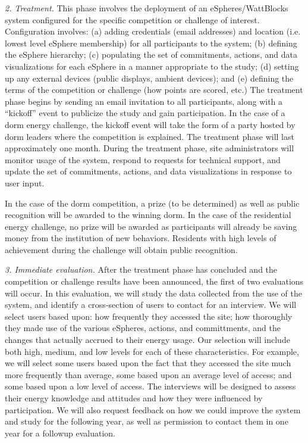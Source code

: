 {\em 2. Treatment.}  This phase involves the deployment of an
eSpheres/WattBlocks system configured for the specific competition or
challenge of interest.  Configuration involves: (a) adding credentials
(email addresses) and location (i.e. lowest level eSphere membership) for
all participants to the system; (b) defining the eSphere hierarchy; (c)
populating the set of commitments, actions, and data visualizations for
each eSphere in a manner appropriate to the study; (d) setting up any
external devices (public displays, ambient devices); and (e) defining the
terms of the competition or challenge (how points are scored, etc.)  The
treatment phase begins by sending an email invitation to all participants,
along with a ``kickoff'' event to publicize the study and gain
participation. In the case of a dorm energy challenge, the kickoff event
will take the form of a party hosted by dorm leaders where the competition
is explained.  The treatment phase will last approximately one month.
During the treatment phase, site administrators will monitor usage of the
system, respond to requests for technical support, and update the set of
commitments, actions, and data visualizations in response to user input.

In the case of the dorm competition, a prize (to be determined) as well as
public recognition will be awarded to the winning dorm.  In the case of the
residential energy challenge, no prize will be awarded as participants will
already be saving money from the institution of new behaviors.  Residents
with high levels of achievement during the challenge will obtain public
recognition. 

{\em 3. Immediate evaluation.}  After the treatment phase has
concluded and the competition or challenge results have been announced, the
first of two evaluations will occur.  In this evaluation, we will study the
data collected from the use of the system, and identify a cross-section of
users to contact for an interview.  We will select users based upon: how
frequently they accessed the site; how thoroughly they made use of the
various eSpheres, actions, and committments, and the changes that actually
accrued to their energy usage.  Our selection will include both high,
medium, and low levels for each of these characteristics. For example, we
will select some users based upon the fact that they accessed the site much
more frequently than average, some based upon an average level of access;
and some based upon a low level of access.  The interviews will be
designed to assess their energy knowledge and attitudes and how they were
influenced by participation.  We will also request feedback on how we could
improve the system and study for the following year, as well as permission
to contact them in one year for a followup evaluation.

